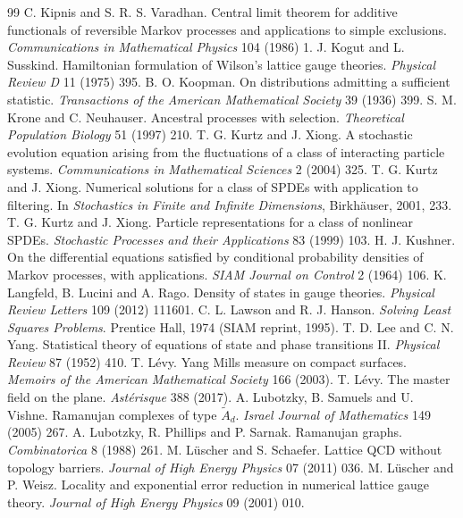\begin{thebibliography}{99}
 C. Kipnis and S. R. S. Varadhan. Central limit theorem for additive functionals of reversible Markov processes and applications to simple exclusions. \emph{Communications in Mathematical Physics} 104 (1986) 1.
 J. Kogut and L. Susskind. Hamiltonian formulation of Wilson's lattice gauge theories. \emph{Physical Review D} 11 (1975) 395.
 B. O. Koopman. On distributions admitting a sufficient statistic. \emph{Transactions of the American Mathematical Society} 39 (1936) 399.
 S. M. Krone and C. Neuhauser. Ancestral processes with selection. \emph{Theoretical Population Biology} 51 (1997) 210.
 T. G. Kurtz and J. Xiong. A stochastic evolution equation arising from the fluctuations of a class of interacting particle systems. \emph{Communications in Mathematical Sciences} 2 (2004) 325.
 T. G. Kurtz and J. Xiong. Numerical solutions for a class of SPDEs with application to filtering. In \emph{Stochastics in Finite and Infinite Dimensions}, Birkh\"auser, 2001, 233.
 T. G. Kurtz and J. Xiong. Particle representations for a class of nonlinear SPDEs. \emph{Stochastic Processes and their Applications} 83 (1999) 103.
 H. J. Kushner. On the differential equations satisfied by conditional probability densities of Markov processes, with applications. \emph{SIAM Journal on Control} 2 (1964) 106.
 K. Langfeld, B. Lucini and A. Rago. Density of states in gauge theories. \emph{Physical Review Letters} 109 (2012) 111601.
 C. L. Lawson and R. J. Hanson. \emph{Solving Least Squares Problems}. Prentice Hall, 1974 (SIAM reprint, 1995).
 T. D. Lee and C. N. Yang. Statistical theory of equations of state and phase transitions II. \emph{Physical Review} 87 (1952) 410.
 T. L\'evy. Yang Mills measure on compact surfaces. \emph{Memoirs of the American Mathematical Society} 166 (2003).
 T. L\'evy. The master field on the plane. \emph{Ast\'erisque} 388 (2017).
 A. Lubotzky, B. Samuels and U. Vishne. Ramanujan complexes of type $\tilde A_d$. \emph{Israel Journal of Mathematics} 149 (2005) 267.
 A. Lubotzky, R. Phillips and P. Sarnak. Ramanujan graphs. \emph{Combinatorica} 8 (1988) 261.
 M. L\"uscher and S. Schaefer. Lattice QCD without topology barriers. \emph{Journal of High Energy Physics} 07 (2011) 036.
 M. L\"uscher and P. Weisz. Locality and exponential error reduction in numerical lattice gauge theory. \emph{Journal of High Energy Physics} 09 (2001) 010.

\end{thebibliography}
